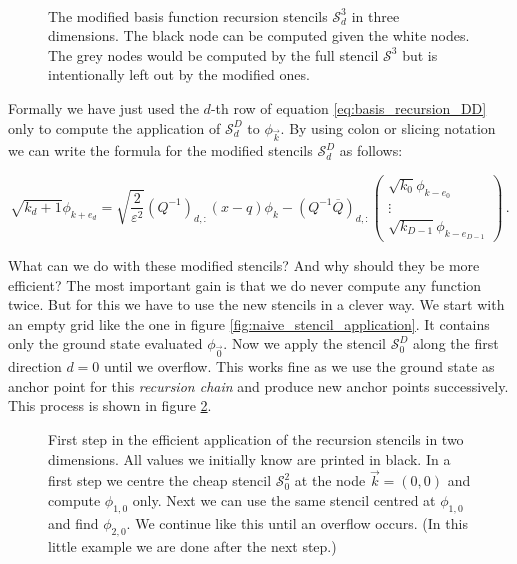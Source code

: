 \begin{figure}[h!]
  \centering
  \subfloat[][$\mathcal{S}^3_0$]{
    
  }
  \subfloat[][$\mathcal{S}^3_1$]{
    
  }
  \subfloat[][$\mathcal{S}^3_2$]{
    
  } \\
    \caption[Cheap recursion stencils in three dimensions]{The modified basis
    function recursion stencils $\mathcal{S}^3_d$ in three dimensions.
    The black node can be computed given the white nodes. The grey nodes would be
    computed by the full stencil $\mathcal{S}^3$ but is intentionally left out by
    the modified ones.}
    \label{fig:recursion_stencils_cheap_3D}
\end{figure}

Formally we have just used the $d$-th row of equation \eqref{eq:basis_recursion_DD} only
to compute the application of $\mathcal{S}^D_d$ to $\phi_{\vec{k}}$. By using colon or
slicing notation we can write the formula for the modified stencils $\mathcal{S}^D_d$
as follows:

\begin{equation}
  \sqrt{k_d +1} \phi_{k + e_d}
  = \sqrt{\frac{2}{\varepsilon^2}}
  \left(Q^{-1}\right)_{d,:}
  \left( x-q \right)
  \phi_{k}
  -
  \left(Q^{-1} \overline{Q} \right)_{d,:}
  \begin{pmatrix}
    \sqrt{k_0} \phi_{k - e_0} \\
    \vdots \\
    \sqrt{k_{D-1}} \phi_{k - e_{D-1}}
  \end{pmatrix} \,.
\end{equation}

What can we do with these modified stencils? And why should they be more efficient?
The most important gain is that we do never compute any function twice. But for this
we have to use the new stencils in a clever way. We start with an empty grid like the
one in figure \ref{fig:naive_stencil_application}. It contains only the ground state
evaluated $\phi_{\vec{0}}$. Now we apply the stencil $\mathcal{S}^D_0$ along the first
direction $d=0$ until we overflow. This works fine as we use the ground state as
anchor point for this \emph{recursion chain} and produce new anchor points successively.
This process is shown in figure \ref{fig:efficient_stencil_application_d0}.

\begin{figure}
  \centering
  
  \caption[Efficient stencil application in two dimensions]{
           First step in the efficient application of the recursion stencils
           in two dimensions. All values we initially know are printed in black.
           In a first step we centre the cheap stencil $\mathcal{S}^2_0$ at the
           node $\vec{k} = (0,0)$ and compute $\phi_{1,0}$ only. Next we can use
           the same stencil centred at $\phi_{1,0}$ and find $\phi_{2,0}$. We
           continue like this until an overflow occurs. (In this little example
           we are done after the next step.)}
  \label{fig:efficient_stencil_application_d0}
\end{figure}

